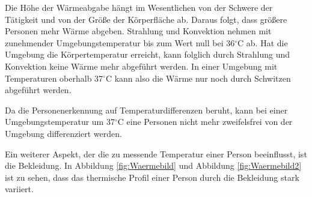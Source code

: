 Die Höhe der Wärmeabgabe hängt im Wesentlichen von der Schwere der Tätigkeit und von der Größe der Körperfläche ab. Daraus folgt, dass größere Personen mehr Wärme abgeben. Strahlung und Konvektion nehmen mit zunehmender Umgebungstemperatur bis zum Wert null bei 36$^\circ$C ab. Hat die Umgebung die Körpertemperatur erreicht, kann folglich durch Strahlung und Konvektion keine Wärme mehr abgeführt werden. In einer Umgebung mit Temperaturen oberhalb 37$^\circ$C kann also die Wärme nur noch durch Schwitzen abgeführt werden.\protect\cite{MenschWaerme}

Da die Personenerkennung auf Temperaturdifferenzen beruht, kann bei einer Umgebungstemperatur um 37$^\circ$C eine Personen nicht mehr zweifelsfrei von der Umgebung differenziert werden. 

Ein weiterer Aspekt, der die zu messende Temperatur einer Person beeinflusst, ist die Bekleidung. In Abbildung \ref{fig:Waermebild} und Abbildung \ref{fig:Waermebild2} ist zu sehen, dass das thermische Profil einer Person durch die Bekleidung stark variiert.


